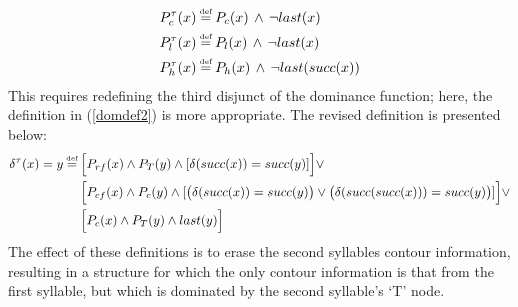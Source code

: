 \documentclass{article}
\newcommand\myeq{\mathrel{\stackrel{\makebox[0pt]{\mbox{\normalfont\tiny def}}}{=}}}
\begin{document}
\begin{equation}
\begin{aligned}
P^{\tau}_{c}(x)&\myeq P_{c}(x)\,\land\,\neg last(x) \\
P^{\tau}_{l}(x)&\myeq P_{l}(x)\,\land\,\neg last(x) \\
P^{\tau}_{h}(x)&\myeq P_{h}(x)\,\land\,\neg last(succ(x)) \\
\end{aligned}
\end{equation}
 This requires redefining the third disjunct of the dominance function; here, the definition in (\ref{domdef2}) is more appropriate. The revised definition is presented below:
\begin{equation}
\begin{aligned}
\delta^{\tau}(x)=y&\myeq\Big[P_{rf}(x)\land P_{T}(y)\land[\delta(succ(x)) = succ(y)]\Big]\lor \\
&\quad\,\,\Big[P_{cf}(x)\land P_{c}(y)\land[\big(\delta(succ(x))=succ(y)\big)\lor\big(\delta(succ(succ(x)))=succ(y)\big)]\Big]\lor \\
&\quad\,\,\Big[P_{c}(x)\land P_{T}(y)\land last(y)\Big]
\end{aligned}
\end{equation}
The effect of these definitions is to erase the second syllables contour information, resulting in a structure for which the only contour information is that from the first syllable, but which is dominated by the second syllable's `T' node.
\end{document}
